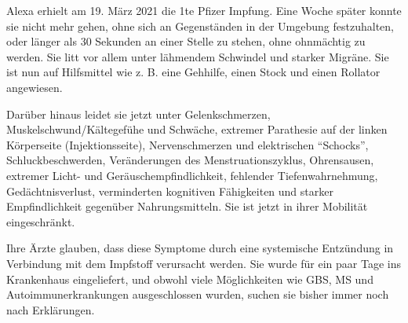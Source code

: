 Alexa erhielt am 19. März 2021 die 1te Pfizer Impfung. Eine Woche später konnte
sie nicht mehr gehen, ohne sich an Gegenständen in der Umgebung festzuhalten,
oder länger als 30 Sekunden an einer Stelle zu stehen, ohne ohnmächtig zu
werden. Sie litt vor allem unter lähmendem Schwindel und starker Migräne. Sie
ist nun auf Hilfsmittel wie z. B. eine Gehhilfe, einen Stock und einen Rollator
angewiesen.

Darüber hinaus leidet sie jetzt unter Gelenkschmerzen, Muskelschwund/Kältegefühe
und Schwäche, extremer Parathesie auf der linken Körperseite (Injektionsseite),
Nervenschmerzen und elektrischen ``Schocks'', Schluckbeschwerden, Veränderungen
des Menstruationszyklus, Ohrensausen, extremer Licht- und
Geräuschempfindlichkeit, fehlender Tiefenwahrnehmung, Gedächtnisverlust,
verminderten kognitiven Fähigkeiten und starker Empfindlichkeit gegenüber
Nahrungsmitteln. Sie ist jetzt in ihrer Mobilität eingeschränkt.

Ihre Ärzte glauben, dass diese Symptome durch eine systemische Entzündung in
Verbindung mit dem Impfstoff verursacht werden. Sie wurde für ein paar Tage ins
Krankenhaus eingeliefert, und obwohl viele Möglichkeiten wie GBS, MS und
Autoimmunerkrankungen ausgeschlossen wurden, suchen sie bisher immer noch nach
Erklärungen.
